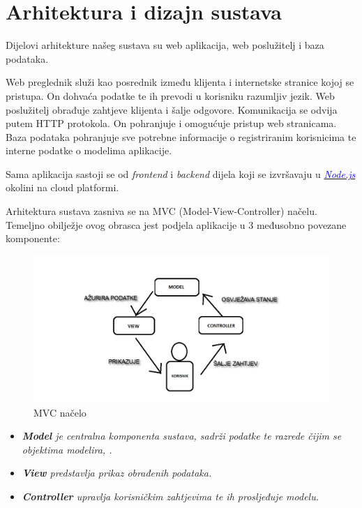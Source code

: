 \chapter{Arhitektura i dizajn sustava}
		
		  Dijelovi arhitekture našeg sustava su web aplikacija, web poslužitelj i baza podataka.
	    
        Web preglednik služi kao posrednik između klijenta i internetske stranice kojoj se pristupa. On dohvaća podatke te ih prevodi u korisniku razumljiv jezik.
        Web poslužitelj obrađuje zahtjeve klijenta i šalje odgovore. Komunikacija se odvija putem HTTP protokola. On pohranjuje i omogućuje pristup web stranicama.
        Baza podataka pohranjuje sve potrebne informacije o registriranim korisnicima te interne podatke o modelima aplikacije.
        
        Sama aplikacija sastoji se od \textit{frontend} i \textit{backend} dijela koji se izvršavaju u \href{https://nodejs.org/}{\textit{\textcolor{blue}{Node.js}}} okolini na cloud platformi.
        \newline
        
        
        
		 Arhitektura sustava zasniva se na MVC (Model-View-Controller)
		načelu. Temeljno obilježje ovog obrasca jest podjela aplikacije u 3 međusobno povezane komponente:
		
		\begin{figure}[h]
			\includegraphics[scale=0.5]{images/mvc.jpeg}
			\caption{MVC načelo}
			\label{fig:MVC slika} 
		\end{figure}
		\begin{itemize}
			\item 	\textit{ \textbf{Model} je centralna komponenta sustava, sadrži podatke te razrede čijim se objektima modelira, .}
			\item 	\textit{\textbf{View} predstavlja prikaz obrađenih podataka.}
			\item 	\textit {\textbf{Controller} upravlja korisničkim zahtjevima te ih prosljeđuje modelu.}
		\end{itemize}
